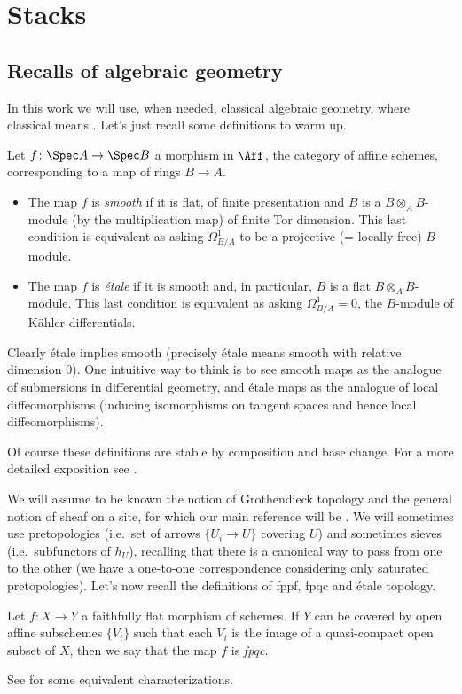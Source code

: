 \chapter{Stacks}
    \label{chapter:stacks}
    \section{Recalls of algebraic geometry}
        In this work we will use, when needed, classical algebraic geometry, where classical means \cite{Hart}. Let's just recall some definitions to warm up.
        
        \begin{defn}
            \label{defn:smooth_etale_classic}
            Let $f\colon \Spec A \to \Spec B$ a morphism in $\Aff$, the category of affine schemes, corresponding to a map of rings $B \to A$.
            \begin{itemize}
                \item The map $f$ is \emph{smooth} if it is flat, of finite presentation and $B$ is a $B \otimes_A B$-module (by the multiplication map) of finite Tor dimension. This last condition is equivalent as asking $\Omega^1_{B/A}$ to be a projective (= locally free) $B$-module.
                \item The map $f$ is \emph{étale} if it is smooth and, in particular, $B$ is a flat $B \otimes_A B$-module. This last condition is equivalent as asking $\Omega^1_{B/A} = 0$, the $B$-module of K\"{a}hler differentials.
            \end{itemize}
        \end{defn}
        Clearly étale implies smooth (precisely étale means smooth with relative dimension $0$). One intuitive way to think is to see smooth maps as the analogue of submersions in differential geometry, and étale maps as the analogue of local diffeomorphisms (inducing isomorphisms on tangent spaces and hence local diffeomorphisms).

        Of course these definitions are stable by composition and base change.
        For a more detailed exposition see \cite[Chapther~III, 10]{Hart}.

        We will assume to be known the notion of Grothendieck topology and the general notion of sheaf on a site, for which our main reference will be \cite{Vist:desc}. We will sometimes use pretopologies (i.e.\ set of arrows $\{U_i \to U\}$ covering $U$) and sometimes sieves (i.e.\ subfunctors of $h_U$), recalling that there is a canonical way to pass from one to the other (we have a one-to-one correspondence considering only saturated pretopologies).
        Let's now recall the definitions of fppf, fpqc and étale topology.
        \begin{defn}
            \label{defn:fpqc_morphism}
            Let $f\colon X \to Y$ a faithfully flat morphism of schemes. If $Y$ can be covered by open affine subschemes $\{V_i\}$ such that each $V_i$ is the image of a quasi-compact open subset of $X$, then we say that the map $f$ is \emph{fpqc}.
        \end{defn}
        See \cite[Proposition~2.33]{Vist:desc} for some equivalent characterizations.

